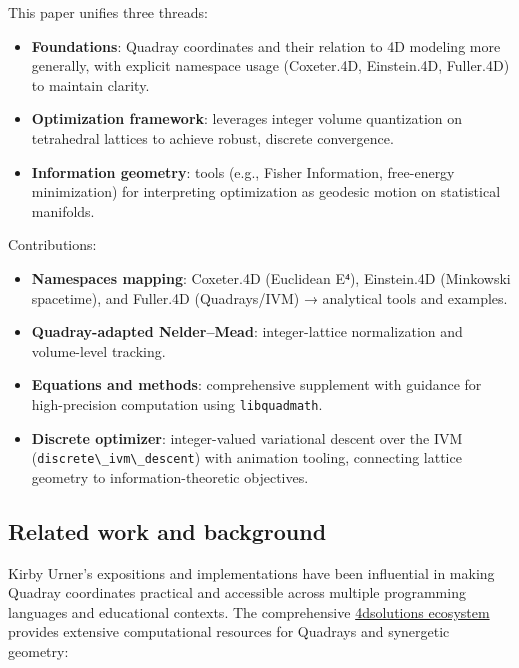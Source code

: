 \documentclass[
  10pt,
]{article}
\newcommand{\passthrough}[1]{#1}
\providecommand{\tightlist}{%
  \setlength{\itemsep}{0pt}\setlength{\parskip}{0pt}}
\begin{document}
This paper unifies three threads:

\begin{itemize}
\tightlist
\item
  \textbf{Foundations}: Quadray coordinates and their relation to 4D
  modeling more generally, with explicit namespace usage (Coxeter.4D,
  Einstein.4D, Fuller.4D) to maintain clarity.
\item
  \textbf{Optimization framework}: leverages integer volume quantization
  on tetrahedral lattices to achieve robust, discrete convergence.
\item
  \textbf{Information geometry}: tools (e.g., Fisher Information,
  free-energy minimization) for interpreting optimization as geodesic
  motion on statistical manifolds.
\end{itemize}

Contributions:

\begin{itemize}
\tightlist
\item
  \textbf{Namespaces mapping}: Coxeter.4D (Euclidean E⁴), Einstein.4D
  (Minkowski spacetime), and Fuller.4D (Quadrays/IVM) → analytical tools
  and examples.
\item
  \textbf{Quadray-adapted Nelder--Mead}: integer-lattice normalization
  and volume-level tracking.
\item
  \textbf{Equations and methods}: comprehensive supplement with guidance
  for high-precision computation using
  \passthrough{\lstinline!libquadmath!}.
\item
  \textbf{Discrete optimizer}: integer-valued variational descent over
  the IVM (\passthrough{\lstinline!discrete\_ivm\_descent!}) with
  animation tooling, connecting lattice geometry to
  information-theoretic objectives.
\end{itemize}

\hypertarget{related-work-and-background}{%
\subsection{Related work and
background}\label{related-work-and-background}}

Kirby Urner's expositions and implementations have been influential in
making Quadray coordinates practical and accessible across multiple
programming languages and educational contexts. The comprehensive
\href{https://github.com/4dsolutions}{4dsolutions ecosystem} provides
extensive computational resources for Quadrays and synergetic geometry:
\end{document}
